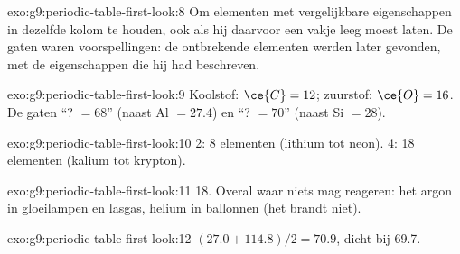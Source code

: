 \begin{solution}{exo:g9:periodic-table-first-look:8}
Om elementen met vergelijkbare eigenschappen in dezelfde kolom te
houden, ook als hij daarvoor een vakje leeg moest laten. De gaten waren
voorspellingen: de ontbrekende elementen werden later gevonden, met de
eigenschappen die hij had beschreven.
\end{solution}

\begin{solution}{exo:g9:periodic-table-first-look:9}
Koolstof: $\ce{C} = 12$; zuurstof: $\ce{O} = 16$. De gaten ``? $= 68$'' (naast
Al $= 27.4$) en ``? $= 70$'' (naast Si $= 28$).
\end{solution}

\begin{solution}{exo:g9:periodic-table-first-look:10}
 2: 8 elementen (lithium tot neon).  4: 18 elementen
(kalium tot krypton).
\end{solution}

\begin{solution}{exo:g9:periodic-table-first-look:11}
 18. Overal waar niets mag reageren: het argon in gloeilampen en
lasgas, helium in ballonnen (het brandt niet).
\end{solution}

\begin{solution}{exo:g9:periodic-table-first-look:12}
$(27.0 + 114.8)/2 = 70.9$, dicht bij 69.7.
\end{solution}


